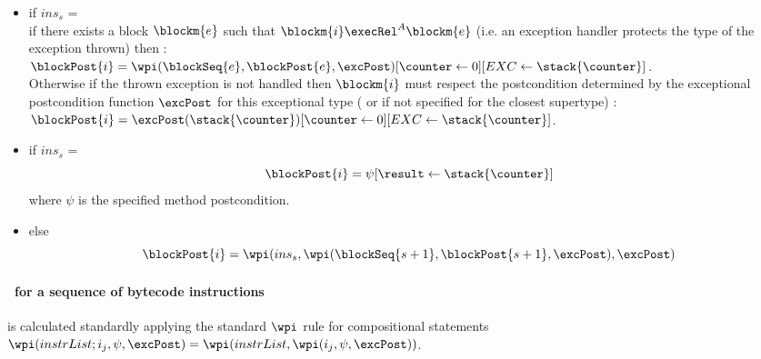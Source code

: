 \begin{defn}
\begin{itemize}
\item  if  $ins_s$ =   \\ 
if there exists a block $\blockm{e}$ such that 
$\blockm{i} \execRel^A \blockm{e}$ (i.e. an exception handler protects the type of the exception thrown)
then :\\
$\blockPost{i }= \\ \wpi(\blockSeq{e}, \blockPost{e} ,\excPost)[\counter \leftarrow 0][EXC \leftarrow \stack{\counter}] $. \\
Otherwise if the thrown exception is not handled then $\blockm{i}$ must respect the postcondition determined by
the exceptional postcondition function $\excPost$ for this exceptional type ( or if not specified for the closest supertype) : \\ 
 $\blockPost{i }= \excPost(\stack{\counter}) [\counter \leftarrow 0][EXC \leftarrow \stack{\counter}] $. \\
    
\item  if  $ins_s$ =  \\
$$
   \blockPost{i } = \psi[\result \leftarrow \stack{\counter} ]    
$$
where $\psi $ is the specified method postcondition.
\item  else  
 $$ \blockPost{i} =  \wpi(  ins_s , \wpi( \blockSeq{s+1} ,  \blockPost{ s  +1}, \excPost) , \excPost)  $$ 
 \end{itemize}

\end{defn}

\paragraph{\wpi \ for a sequence of bytecode instructions} is calculated standardly applying the standard $\wpi$ rule for compositional statements $\wpi( instrList;i_{j}, \psi,\excPost ) =\wpi(instrList, \wpi(i_{j}, \psi,\excPost )) $. %


